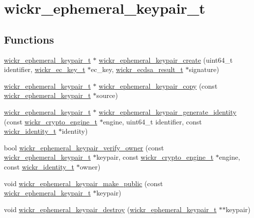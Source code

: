 \hypertarget{group__wickr__ephemeral__keypair}{}\section{wickr\+\_\+ephemeral\+\_\+keypair\+\_\+t}
\label{group__wickr__ephemeral__keypair}
\subsection*{Functions}
\begin{DoxyCompactItemize}
\item 
\hyperlink{structwickr__ephemeral__keypair}{wickr\+\_\+ephemeral\+\_\+keypair\+\_\+t} $\ast$ \hyperlink{group__wickr__ephemeral__keypair_gab956214203938b4b02b8f30666eaec3b}{wickr\+\_\+ephemeral\+\_\+keypair\+\_\+create} (uint64\+\_\+t identifier, \hyperlink{structwickr__ec__key}{wickr\+\_\+ec\+\_\+key\+\_\+t} $\ast$ec\+\_\+key, \hyperlink{structwickr__ecdsa__result}{wickr\+\_\+ecdsa\+\_\+result\+\_\+t} $\ast$signature)
\item 
\hyperlink{structwickr__ephemeral__keypair}{wickr\+\_\+ephemeral\+\_\+keypair\+\_\+t} $\ast$ \hyperlink{group__wickr__ephemeral__keypair_gacf14f050221091093b9a2948bd569662}{wickr\+\_\+ephemeral\+\_\+keypair\+\_\+copy} (const \hyperlink{structwickr__ephemeral__keypair}{wickr\+\_\+ephemeral\+\_\+keypair\+\_\+t} $\ast$source)
\item 
\hyperlink{structwickr__ephemeral__keypair}{wickr\+\_\+ephemeral\+\_\+keypair\+\_\+t} $\ast$ \hyperlink{group__wickr__ephemeral__keypair_ga6c0935c579e3d4bdbfeada7cb60c2a1b}{wickr\+\_\+ephemeral\+\_\+keypair\+\_\+generate\+\_\+identity} (const \hyperlink{structwickr__crypto__engine}{wickr\+\_\+crypto\+\_\+engine\+\_\+t} $\ast$engine, uint64\+\_\+t identifier, const \hyperlink{structwickr__identity}{wickr\+\_\+identity\+\_\+t} $\ast$identity)
\item 
bool \hyperlink{group__wickr__ephemeral__keypair_gadc17110d4c7fa65a9456fae516bf2e5d}{wickr\+\_\+ephemeral\+\_\+keypair\+\_\+verify\+\_\+owner} (const \hyperlink{structwickr__ephemeral__keypair}{wickr\+\_\+ephemeral\+\_\+keypair\+\_\+t} $\ast$keypair, const \hyperlink{structwickr__crypto__engine}{wickr\+\_\+crypto\+\_\+engine\+\_\+t} $\ast$engine, const \hyperlink{structwickr__identity}{wickr\+\_\+identity\+\_\+t} $\ast$owner)
\item 
void \hyperlink{group__wickr__ephemeral__keypair_ga2e2f8db184aa2972ef5423e9c03988e8}{wickr\+\_\+ephemeral\+\_\+keypair\+\_\+make\+\_\+public} (const \hyperlink{structwickr__ephemeral__keypair}{wickr\+\_\+ephemeral\+\_\+keypair\+\_\+t} $\ast$keypair)
\item 
void \hyperlink{group__wickr__ephemeral__keypair_gab77107c0b1a0d145c606817eeecec63d}{wickr\+\_\+ephemeral\+\_\+keypair\+\_\+destroy} (\hyperlink{structwickr__ephemeral__keypair}{wickr\+\_\+ephemeral\+\_\+keypair\+\_\+t} $\ast$$\ast$keypair)
\end{DoxyCompactItemize}


